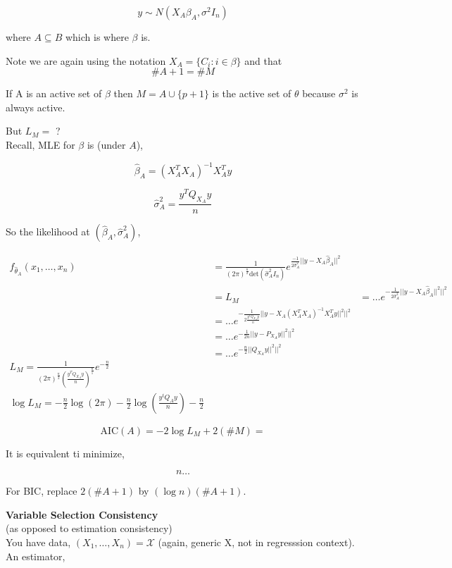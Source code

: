 \documentclass[11pt,fleqn]{book} %
\begin{document}
$$y \sim N(X_A\beta_A, \sigma^2 I_n)$$

where $A \subseteq B$ which is where $\beta$ is. 

Note we are again using the notation $X_A = \{C_i: i \in \beta \}$ and that 
$$\#A + 1 = \# M $$

If A is an active set of $\beta$ then $M = A \cup \{p+1 \}$ is the active set of $\theta$ because $\sigma^2$ is always active. 

But $L_M = $ ?\\

Recall, MLE for $\beta$ is (under $A$), 

$$\hat{\beta}_A = (X_A^TX_A)^{-1}X^T_A y $$

$$\hat{\sigma}^2_A = \frac{y^T Q_{X_A}y}{n}$$

So the likelihood at $(\hat{\beta}_A, \hat{\sigma}_A^2)$, 

\begin{align*}
	f_{\hat{\theta}_A}(x_1, \dots, x_n) &= \frac{1}{(2\pi)^{\frac{n}{2}} \text{det}(\hat{\sigma}^2_A I_n) } e^{\frac{-1}{2\hat{\sigma}^2_A} ||y - X_A \hat{\beta}_A ||^2}\\
		&= L_M
		&= \dots e^{-\frac{1}{2\hat{\sigma}^2_A} ||y - X_A \hat{\beta}_A ||^2||^2}\\
		&= \dots e^{-\frac{1}{2 \frac{y^T Q_{X_A}y}{n}} ||y - X_A (X_A^TX_A)^{-1}X^T_A y ||^2||^2}\\
		&= \dots e^{-\frac{1}{2 n} ||y - P_{X_A} y ||^2||^2}\\
 		&= \dots e^{-\frac{n}{2 } ||Q_{X_A} y ||^2||^2}\\
 	L_M = \frac{1}{(2\pi)^{\frac{n}{2}} (\frac{y^T Q_{X_A}y}{n})^{\frac{n}{1}} }e^{-\frac{n}{2 }}\\
 	\log L_M = -\frac{n}{2}\log(2\pi) - \frac{n}{2} \log (\frac{y^tQ_A y}{n}) - \frac{n}{2}
\end{align*}

$$\text{AIC}(A) = -2 \log L_M + 2(\#M) =   $$

It is equivalent ti minimize,

$$n\dots $$

For BIC, replace $2(\#A + 1)$ by $(\log n)(\#A + 1)$.



\textbf{Variable Selection Consistency}\\
(as opposed to estimation consistency)\\

You have data, $(X_1, \dots, X_n) = \mathscr{X}$ (again, generic X, not in regresssion context). An estimator, 
\end{document}
